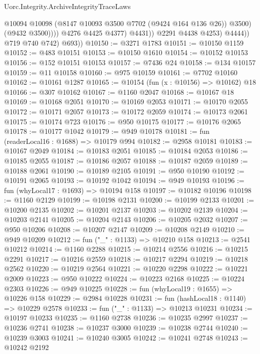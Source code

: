 \begin{lexlean}{Uorc.Integrity.ArchiveIntegrityTraceLaws}
\begin{coremodule}
                              @10094
                              @10098
                              (@8147 @10093 @3500 @7702 (@9424 @164 @136 @26))
                              @3500)
                            (@9432 @3500))))
                      @4276
                      @4425
                      @4377)
                    @4431))
                @2291
                @4438
                @4253)
              @4444))
          @719
          @740
          @742)
        @693))
@10150 := @3271 @1783
@10151 := @10150 @1159
@10152 := @483 @10151
@10153 := @10150 @1610
@10154 := @10152 @10153
@10156 := @152 @10151 @10153
@10157 := @7436 @24
@10158 := @134 @10157
@10159 := @11 @10158
@10160 := @975 @10159
@10161 := @7702 @10160
@10162 := @10161 @1287
@10165 := @10154 (fun (x : @10156) => @10162) @18
@10166 := @307 @10162
@10167 := @1160 @2047
@10168 := @10167 @18
@10169 := @10168 @2051
@10170 := @10169 @2053
@10171 := @10170 @2055
@10172 := @10171 @2057
@10173 := @10172 @2059
@10174 := @10173 @2061
@10175 := @10174 @723
@10176 := @950 @10175
@10177 := @10176 @2065
@10178 := @10177 @1042
@10179 := @949 @10178
@10181 := fun (readerLocal16 : @1688) => @10179 @994
@10182 := @2958 @10181
@10183 := @10167 @2049
@10184 := @10183 @2051
@10185 := @10184 @2053
@10186 := @10185 @2055
@10187 := @10186 @2057
@10188 := @10187 @2059
@10189 := @10188 @2061
@10190 := @10189 @2105
@10191 := @950 @10190
@10192 := @10191 @2065
@10193 := @10192 @1042
@10194 := @949 @10193
@10196 := fun (whyLocal17 : @1693) => @10194 @158
@10197 := @10182 @10196
@10198 := @1160 @2129
@10199 := @10198 @2131
@10200 := @10199 @2133
@10201 := @10200 @2135
@10202 := @10201 @2137
@10203 := @10202 @2139
@10204 := @10203 @2141
@10205 := @10204 @2143
@10206 := @10205 @2032
@10207 := @950 @10206
@10208 := @10207 @2147
@10209 := @10208 @2149
@10210 := @949 @10209
@10212 := fun ("_" : @1133) => @10210 @158
@10213 := @2541 @10212
@10214 := @1160 @2288
@10215 := @10214 @2556
@10216 := @10215 @2291
@10217 := @10216 @2559
@10218 := @10217 @2294
@10219 := @10218 @2562
@10220 := @10219 @2564
@10221 := @10220 @2298
@10222 := @10221 @2009
@10223 := @950 @10222
@10224 := @10223 @2168
@10225 := @10224 @2303
@10226 := @949 @10225
@10228 := fun (whyLocal19 : @1655) => @10226 @158
@10229 := @2984 @10228
@10231 := fun (hashLocal18 : @1140) => @10229 @2578
@10233 := fun ("_" : @1133) => @10213 @10231
@10234 := @10197 @10233
@10235 := @1160 @2738
@10236 := @10235 @2997
@10237 := @10236 @2741
@10238 := @10237 @3000
@10239 := @10238 @2744
@10240 := @10239 @3003
@10241 := @10240 @3005
@10242 := @10241 @2748
@10243 := @10242 @2192

\end{coremodule}
\end{lexlean}
